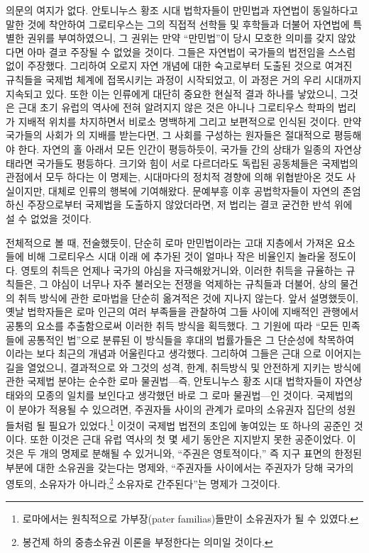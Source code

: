 의문의 여지가 없다.
안토니누스 황조 시대 법학자들이 만민법과 자연법이 동일하다고 말한 것에
착안하여
그로티우스는 그의 직접적 선학들 및 후학들과 더불어
자연법에 특별한 권위를 부여하였으니,
그 권위는 만약 ``만민법''이 당시 모호한 의미를 갖지 않았다면
아마 결코 주장될 수 없었을 것이다.
그들은 자연법이 국가들의 법전임을 스스럼없이 주장했다.
그리하여
오로지 자연 개념에 대한 숙고로부터 도출된 것으로 여겨진 규칙들을
국제법 체계에 접목시키는 과정이 시작되었고,
이 과정은 거의 우리 시대까지 지속되고 있다.
또한 이는 인류에게 대단히 중요한 현실적 결과 하나를 낳았으니,
그것은 근대 초기 유럽의 역사에 전혀 알려지지 않은 것은 아니나
그로티우스 학파의 법리가 지배적 위치를 차지하면서 비로소
명백하게 그리고 보편적으로 인식된 것이다.
만약 국가들의 사회가 의 지배를 받는다면,
그 사회를 구성하는 원자들은 절대적으로 평등해야 한다.
자연의 홀 아래서 모든 인간이 평등하듯이,
국가들 간의 상태가 일종의 자연상태라면 국가들도 평등하다.
크기와 힘이 서로 다르더라도 독립된 공동체들은
국제법의 관점에서 모두 하다는 이 명제는,
시대마다의 정치적 경향에 의해 위협받아온 것도 사실이지만,
대체로 인류의 행복에 기여해왔다.
문예부흥 이후 공법학자들이
자연의 존엄하신 주장으로부터 국제법을 도출하지 않았더라면,
저 법리는 결코 굳건한 반석 위에 설 수 없었을 것이다.

전체적으로 볼 때, 전술했듯이,
단순히 로마 만민법이라는 고대 지층에서 가져온 요소들에 비해
그로티우스 시대 이래 에 추가된 것이
얼마나 작은 비율인지 놀라울 정도이다.
영토의 취득은 언제나 국가의 야심을 자극해왔거니와,
이러한 취득을 규율하는 규칙들은,
그 야심이 너무나 자주 불러오는 전쟁을 억제하는 규칙들과 더불어,
상의 물건의 취득 방식에 관한 로마법을
단순히 옮겨적은 것에 지나지 않는다.
앞서 설명했듯이,
옛날 법학자들은
로마 인근의 여러 부족들을 관찰하여 그들 사이에 지배적인 관행에서
공통의 요소를 추출함으로써
이러한 취득 방식을
획득했다.
그 기원에 따라
``모든 민족들에 공통적인 법''으로 분류된 이 방식들을
후대의 법률가들은
그 단순성에 착목하여 이라는 보다 최근의 개념과 어울린다고 생각했다.
그리하여 그들은 근대 으로 이어지는
길을 열었으니, 결과적으로
와 그것의 성격, 한계, 취득방식 및
안전하게 지키는 방식에 관한 국제법 분야는
순수한 로마 물권법---즉,
안토니누스 황조 시대 법학자들이 자연상태와의 모종의 일치를 보인다고
생각했던 바로 그 로마 물권법---인 것이다.
국제법의 이 분야가 적용될 수 있으려면,
주권자들 사이의 관계가
로마의 소유권자 집단의 성원들처럼 될 필요가
있었다.\footnote{로마에서는
원칙적으로 가부장(pater familias)들만이 소유권자가 될 수 있였다.}
이것이 국제법 법전의 초입에 놓여있는 또 하나의 공준인 것이다.
또한 이것은 근대 유럽 역사의 첫 몇 세기 동안은 지지받지 못한 공준이었다.
이것은 두 개의 명제로 분해될 수 있거니와,
``주권은 영토적이다,'' 즉
지구 표면의 한정된 부분에 대한 소유권을 갖는다는 명제와,
``주권자들 사이에서는 주권자가 당해 국가의 영토의,
 소유자가 아니라,\footnote{봉건제 하의
중층소유권 이론을 부정한다는 의미일 것이다.}
 소유자로 간주된다''는 명제가
그것이다.

